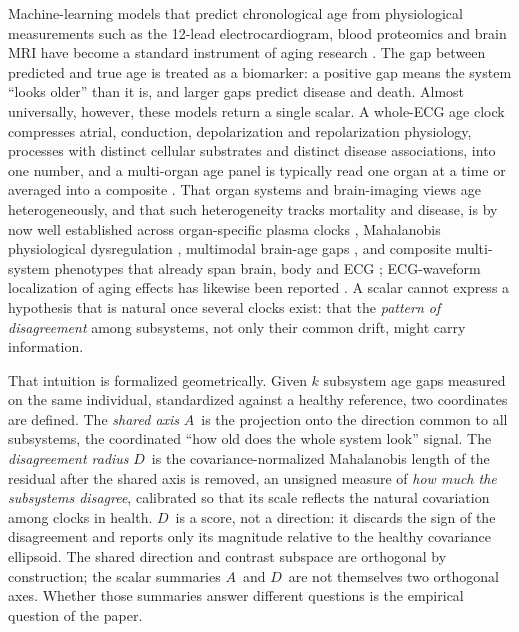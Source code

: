 \documentclass[11pt]{article}
\newcommand{\D}{\ensuremath{D}}
\newcommand{\A}{\ensuremath{A}}
\begin{document}
Machine-learning models that predict chronological age from physiological
measurements such as the 12-lead electrocardiogram, blood proteomics and brain MRI have
become a standard instrument of aging research \citep{lima2021,attia2019,tian2023,oh2023}.
The gap between predicted and true age is treated as a biomarker: a positive gap
means the system ``looks older'' than it is, and larger gaps predict disease and
death. Almost universally, however, these models return a single scalar. A whole-ECG
age clock compresses atrial, conduction, depolarization and repolarization
physiology, processes with distinct cellular substrates and distinct disease
associations, into one number, and a multi-organ age panel is typically read one
organ at a time or averaged into a composite \citep{oh2023,tian2023}. That organ
systems and brain-imaging views age heterogeneously, and that such heterogeneity tracks
mortality and disease, is by now well established across organ-specific plasma clocks
\citep{oh2023,tian2023}, Mahalanobis physiological dysregulation \citep{cohen2013},
multimodal brain-age gaps \citep{wen2024}, and composite multi-system phenotypes that
already span brain, body and ECG \citep{li2025}; ECG-waveform localization of aging
effects has likewise been reported \citep{hempel2025}. A
scalar cannot express a hypothesis that is natural once several clocks exist: that
the \emph{pattern of disagreement} among subsystems, not only their common drift,
might carry information.

That intuition is formalized geometrically. Given $k$ subsystem age gaps measured on
the same individual, standardized against a healthy reference, two
coordinates are defined. The \emph{shared axis} \A\ is the projection onto the direction common
to all subsystems, the coordinated ``how old does the whole system look'' signal.
The \emph{disagreement radius} \D\ is the covariance-normalized Mahalanobis length of
the residual after the shared axis is removed, an unsigned measure of \emph{how much
the subsystems disagree}, calibrated so that its scale reflects the natural
covariation among clocks in health. \D\ is a score, not a direction: it discards the
sign of the disagreement and reports only its magnitude relative to the healthy
covariance ellipsoid. The shared direction and contrast subspace are orthogonal
by construction; the scalar summaries \A\ and \D\ are not themselves two
orthogonal axes. Whether those summaries answer different questions is the
empirical question of the paper.
\end{document}
